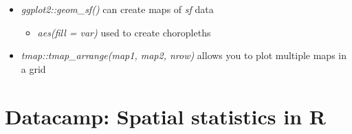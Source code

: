 \documentclass{article}
\begin{document}
\begin{itemize}
\begin{itemize}
    \end{itemize}
    \item \textit{ggplot2::geom\_sf()} can create maps of \textit{sf} data
    \begin{itemize}
        \item \textit{aes(fill = var)} used to create choropleths
    \end{itemize}
    \item \textit{tmap::tmap\_arrange(map1, map2, nrow)} allows you to plot multiple maps in a grid
\end{itemize}

\section{Datacamp: Spatial statistics in R}
\end{document}
